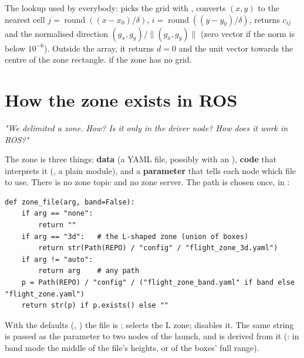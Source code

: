 The lookup used by everybody: picks the grid with , converts $(x,y)$ to the nearest cell
$j=\operatorname{round}((x-x_0)/\delta)$, $i=\operatorname{round}((y-y_0)/\delta)$, returns $c_{ij}$ and the
normalised direction $(g_x, g_y)/\lVert(g_x,g_y)\rVert$ (zero vector if the norm is below $10^{-6}$). Outside the
array, it returns $d=0$ and the unit vector towards the centre of the zone rectangle.  if the zone has
no grid.

\section{How the zone exists in ROS}
\label{sec:zone-ros}

\emph{"We delimited a zone. How? Is it only in the driver node? How does it work in ROS?"}

The zone is three things: \textbf{data} (a YAML file, possibly with an ), \textbf{code} that interprets it
(, a plain module), and a \textbf{parameter} that tells each node which file to use. There is no zone
topic and no zone server. The path is chosen once, in :

\begin{lstlisting}
def zone_file(arg, band=False):
    if arg == "none":
        return ""
    if arg == "3d":   # the L-shaped zone (union of boxes)
        return str(Path(REPO) / "config" / "flight_zone_3d.yaml")
    if arg != "auto":
        return arg    # any path
    p = Path(REPO) / "config" / ("flight_zone_band.yaml" if band else "flight_zone.yaml")
    return str(p) if p.exists() else ""
\end{lstlisting}

With the defaults (, ) the file is ;
 selects the L zone;  disables it. The same string is passed as the
parameter  to two nodes of the launch, and  is derived from it
(: in band mode the middle of the file's heights, or of the boxes' full range).


